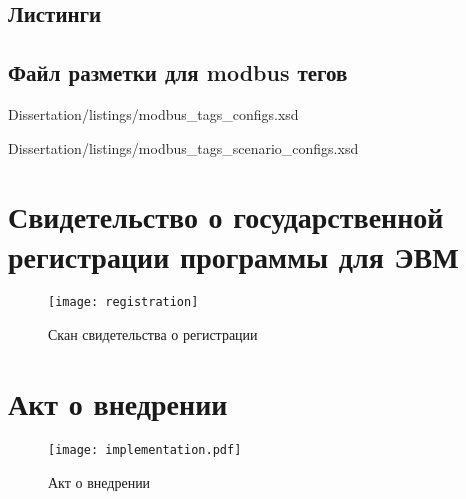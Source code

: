 \begin{landscape}
\chapter{Листинги}
\section{Файл разметки для modbus тегов}


        {Dissertation/listings/modbus_tags_configs.xsd}


        {Dissertation/listings/modbus_tags_scenario_configs.xsd}
        

\end{landscape}

\chapter{Свидетельство о государственной регистрации программы для ЭВМ}\label{ch:app1}


\begin{center}
    \begin{figure}[hb]
        \texttt{[image: registration]}
        \caption{Скан свидетельства о регистрации}\label{app:fig:registration}
    \end{figure}
\end{center}
    


\chapter{Акт о внедрении}\label{ch:app2}

\begin{center}
    \begin{figure}[hb]
        \texttt{[image: implementation.pdf]}
        \caption{Акт о внедрении}\label{app:fig:implementation}
    \end{figure}
\end{center}